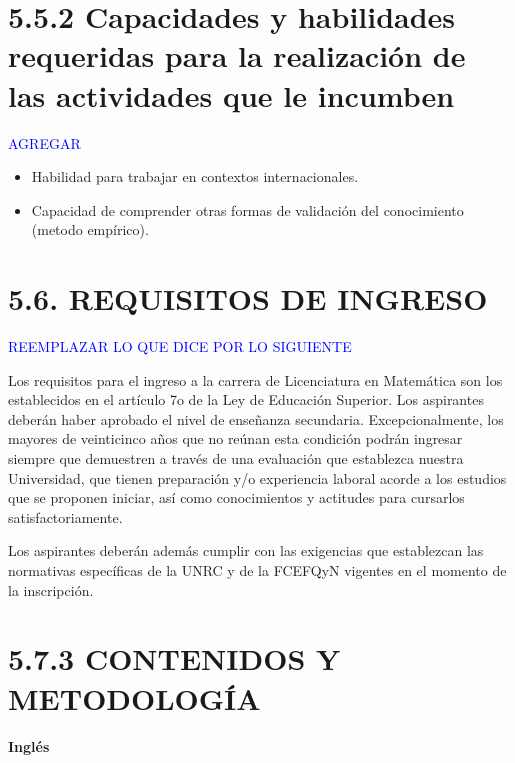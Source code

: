 \documentclass[a4paper, 12pt]{article}
\begin{document}
 
\section*{5.5.2  Capacidades y habilidades requeridas para la realización de las actividades que le incumben}

\textcolor{blue}{AGREGAR}

\begin{itemize}

\item Habilidad para trabajar en contextos internacionales.
 
\item Capacidad de  comprender otras formas de validación del conocimiento (metodo empírico).  

\end{itemize}

%  
%  
%  

\section*{5.6. REQUISITOS DE INGRESO} 

\textcolor{blue}{REEMPLAZAR LO QUE DICE POR LO SIGUIENTE}

Los requisitos para el ingreso a la carrera de Licenciatura en Matemática son los establecidos
en el artículo 7o de la Ley de Educación Superior. Los aspirantes deberán haber aprobado
el nivel de enseñanza secundaria. Excepcionalmente, los mayores de veinticinco años que
no reúnan esta condición podrán ingresar siempre que demuestren a través de una
evaluación que establezca nuestra Universidad, que tienen preparación y/o experiencia
laboral acorde a los estudios que se proponen iniciar, así como conocimientos y actitudes
para cursarlos satisfactoriamente.

Los aspirantes deberán además cumplir con las exigencias
 que establezcan las normativas específicas de la UNRC y de la FCEFQyN    vigentes en el momento 
 de la inscripción. 

 
\section*{5.7.3 CONTENIDOS Y METODOLOGÍA  }

\paragraph{Inglés}
\end{document}

